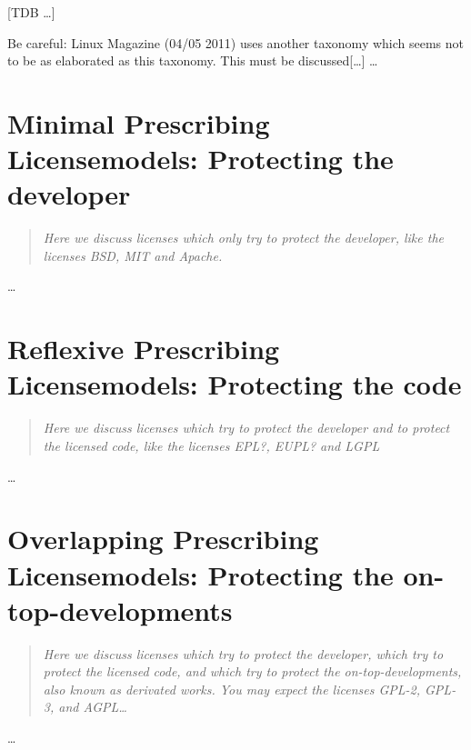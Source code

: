%
%
%
%
%



[TDB \ldots]

Be careful: Linux Magazine (04/05 2011) uses another taxonomy which seems not
to be as elaborated as this taxonomy. This must be discussed[\ldots]
\ldots

\section{Minimal Prescribing Licensemodels: Protecting the developer}
\footnotesize
\begin{quote}\itshape
Here we discuss licenses which only try to protect the developer, like
the licenses \emph{BSD}, \emph{MIT} and \emph{Apache}.
\end{quote}
\normalsize
\ldots

\section{Reflexive Prescribing Licensemodels: Protecting the code}
\footnotesize
\begin{quote}\itshape
Here we discuss licenses which try to protect the developer and to protect the
licensed code, like the licenses \emph{EPL?}, \emph{EUPL?} and
\emph{LGPL}
\end{quote}
\normalsize
\ldots

\section{Overlapping Prescribing Licensemodels: Protecting the on-top-developments}
\footnotesize
\begin{quote}\itshape
Here we discuss licenses which try to protect the developer, which try to
protect the licensed code, and which try to protect the on-top-developments,
also known as derivated works. You may expect the licenses \emph{GPL-2},
\emph{GPL-3}, and \emph{AGPL}\ldots
\end{quote}
\normalsize
\ldots

